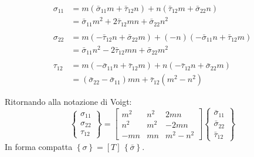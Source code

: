 \begin{align*}
\sigma_{11} &= m(\bar{\sigma}_{11}m + \bar{\tau}_{12}n) + n(\bar{\tau}_{12}m + \bar{\sigma}_{22}n) \\
            &= \bar{\sigma}_{11}m^2 + 2\bar{\tau}_{12}mn + \bar{\sigma}_{22}n^2 \\
\\
\sigma_{22} &= m(-\bar{\tau}_{12}n + \bar{\sigma}_{22}m) + (-n)(-\bar{\sigma}_{11}n + \bar{\tau}_{12}m) \\
            &= \bar{\sigma}_{11}n^2 - 2\bar{\tau}_{12}mn + \bar{\sigma}_{22}m^2 \\
\\
\tau_{12} &= m(-\bar{\sigma}_{11}n + \bar{\tau}_{12}m) + n(-\bar{\tau}_{12}n + \bar{\sigma}_{22}m) \\
          &= (\bar{\sigma}_{22} - \bar{\sigma}_{11})mn + \bar{\tau}_{12}(m^2 - n^2)
\end{align*}

Ritornando alla notazione di Voigt:
\begin{equation*}
    \begin{Bmatrix}
    \sigma_{11} \\
    \sigma_{22} \\
    \tau_{12}
\end{Bmatrix}
=
\begin{bmatrix}
    m^2 & n^2 & 2mn \\
    n^2 & m^2 & -2mn \\
    -mn & mn & m^2-n^2
\end{bmatrix}
\begin{Bmatrix}
    \bar{\sigma}_{11} \\
    \bar{\sigma}_{22} \\
    \bar{\tau}_{12}
\end{Bmatrix}
\end{equation*}
In forma compatta $\left\{\sigma \right\}=\left[T\right]\,\left\{ \bar{\sigma}\right\} $. 

